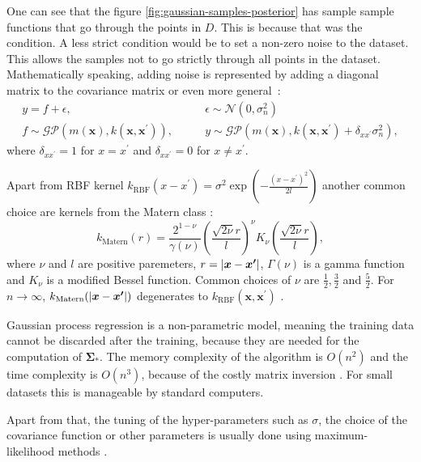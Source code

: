 One can see that the figure \ref{fig:gaussian-samples-posterior} has sample sample functions that go through the points in $D$. This is because that was the condition. A less strict condition would be to set a non-zero noise to the dataset. This allows the samples not to go strictly through all points in the dataset. Mathematically speaking, adding noise is represented by adding a diagonal matrix to the covariance matrix or even more general~\cite{rasmussen2004}:
\begin{equation}
	\begin{split}
		y = f + \epsilon,& \quad  \quad \epsilon \sim \mathcal{N}(0, \sigma_n^2) \\
		f \sim \mathcal{GP}(m(\bm{x}),k(\bm{x},\bm{x}^\prime)), & \quad  \quad y \sim \mathcal{GP}(m(\bm{x}),k(\bm{x},\bm{x}^\prime)+\delta_{xx^\prime}\sigma_n^2),
	\end{split}
\end{equation}
where $\delta_{xx^\prime} = 1$ for $x=x^\prime$ and $\delta_{xx^\prime} = 0$ for $x\neq x^\prime$.

Apart from RBF kernel $k_{\mathrm{RBF}}(x-x^\prime) =\sigma^2\exp(-\frac{(x-x^\prime)^2}{2l})$ another common choice are kernels from the Matern class \cite{rasmussen2005}:
\begin{equation}
	k_\mathrm{Matern}(r) = \frac{2^{1-\nu}}{\gamma(\nu)}\left(\frac{\sqrt{2\nu}r}{l}\right)^\nu K_\nu\left(\frac{\sqrt{2\nu}r}{l}\right),
\end{equation}
where $\nu$ and $l$ are positive paremeters, $r=\lvert \bm{x} -\bm{x^\prime} \rvert$, $\Gamma(\nu)$ is a gamma function and $K_\nu$ is a modified Bessel function. Common choices of $\nu$ are $\frac{1}{2}, \frac{3}{2}$ and $\frac{5}{2}$. For $n \rightarrow \infty$, $k_\mathrm{Matern}(\lvert \bm{x} -\bm{x^\prime} \rvert)$ degenerates to $k_{\mathrm{RBF}}(\bm{x} ,\bm{x^\prime})$ \cite{rasmussen2005}.

Gaussian process regression is a non-parametric model, meaning the training data cannot be discarded after the training, because they are needed for the computation of $\bm{\Sigma_*}$. The memory complexity of the algorithm is $O(n^2)$ and the time complexity is $O(n^3)$, because of the costly matrix inversion \cite{rasmussen2004}. For small datasets this is manageable by standard computers.

Apart from that, the tuning of the hyper-parameters such as $\sigma$, the choice of the covariance function or other parameters is usually done using maximum-likelihood methods \cite{rasmussen2004}.


